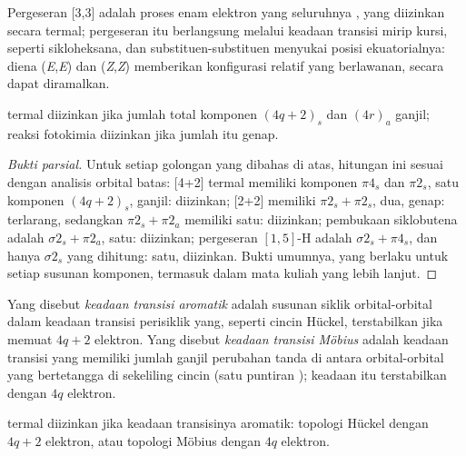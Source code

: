 Pergeseran [3,3] adalah proses enam elektron yang seluruhnya , yang diizinkan secara termal;
pergeseran itu berlangsung melalui keadaan transisi mirip kursi, seperti sikloheksana, dan
substituen-substituen menyukai posisi ekuatorialnya: diena (\textit{E},\textit{E}) dan (\textit{Z},\textit{Z}) memberikan
konfigurasi relatif yang berlawanan, secara dapat diramalkan.

\begin{theorem}\label{thm:b3:pericyclic:woodward-hoffmann}
 termal diizinkan jika jumlah total komponen $(4q + 2)_s$ dan
$(4r)_a$ ganjil; reaksi fotokimia diizinkan jika jumlah itu genap.
\end{theorem}

\begin{proof}[Bukti parsial]
Untuk setiap golongan yang dibahas di atas, hitungan ini sesuai dengan analisis
orbital batas:  [4+2] termal memiliki komponen $\pi4_s$ dan $\pi2_s$, satu komponen $(4q + 2)_s$,
ganjil: diizinkan; [2+2] memiliki $\pi2_s + \pi2_s$, dua, genap: terlarang, sedangkan
$\pi2_s + \pi2_a$ memiliki satu: diizinkan; pembukaan  siklobutena adalah $\sigma2_s + \pi2_a$, satu:
diizinkan; pergeseran $[1,5]$-H  adalah $\sigma2_s + \pi4_s$, dan hanya $\sigma2_s$ yang dihitung: satu,
diizinkan. Bukti umumnya, yang berlaku untuk setiap susunan komponen, termasuk dalam
mata kuliah yang lebih lanjut.
\end{proof}

\begin{definition}\label{def:b3:pericyclic:mobius}
Yang disebut \emph{keadaan transisi aromatik} adalah susunan
siklik orbital-orbital dalam keadaan transisi perisiklik yang, seperti cincin Hückel,
terstabilkan jika memuat $4q + 2$ elektron. Yang disebut \emph{keadaan transisi
Möbius} adalah keadaan transisi yang memiliki jumlah ganjil perubahan tanda di antara
orbital-orbital yang bertetangga di sekeliling cincin (satu puntiran ); keadaan itu
terstabilkan dengan $4q$ elektron.
\end{definition}

\begin{proposition}\label{prop:b3:pericyclic:aromatic-ts}
 termal diizinkan jika keadaan transisinya aromatik:
topologi Hückel dengan $4q + 2$ elektron, atau topologi Möbius dengan $4q$ elektron.
\end{proposition}

